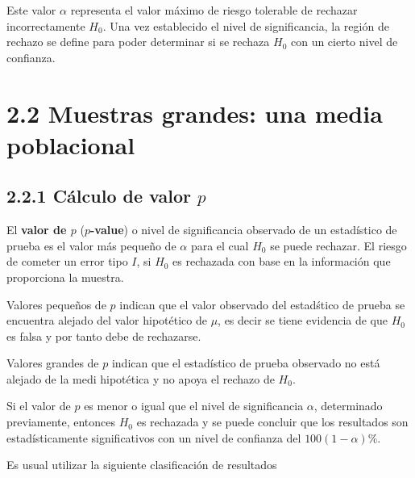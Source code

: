 \begin{frame}
\begin{Def}
\end{Def}

Este valor $\alpha$ representa el valor m\'aximo de riesgo tolerable de rechazar incorrectamente $H_{0}$. Una vez establecido el nivel de significancia, la regi\'on de rechazo se define para poder determinar si se rechaza $H_{0}$ con un cierto nivel de confianza.





\section{2.2 Muestras grandes: una media poblacional}
\subsection{2.2.1 C\'alculo de valor $p$}
\begin{frame}

\begin{Def}
El \textbf{valor de $p$} (\textbf{$p$-value}) o nivel de significancia observado de un estad\'istico de prueba es el valor m\'as peque\~ no de $\alpha$ para el cual $H_{0}$ se puede rechazar. El riesgo de cometer un error tipo $I$, si $H_{0}$ es rechazada con base en la informaci\'on que proporciona la muestra.
\end{Def}

\begin{Note}
Valores peque\~ nos de $p$ indican 	que el valor observado del estad\'stico de prueba se encuentra alejado del valor hipot\'etico de $\mu$, es decir se tiene evidencia de que $H_{0}$ es falsa y por tanto debe de rechazarse.
\end{Note}




\begin{Note}
Valores grandes de $p$ indican que el estad\'istico de prueba observado no est\'a alejado de la medi hipot\'etica y no apoya el rechazo de $H_{0}$.
\end{Note}

\begin{Def}
Si el valor de $p$ es menor o igual que el nivel de significancia $\alpha$, determinado previamente, entonces $H_{0}$ es rechazada y se puede concluir que los resultados son estad\'isticamente significativos con un nivel de confianza del $100\left(1-\alpha\right)\%$.
\end{Def}
Es usual utilizar la siguiente clasificaci\'on de resultados





\end{frame}
\end{frame}
